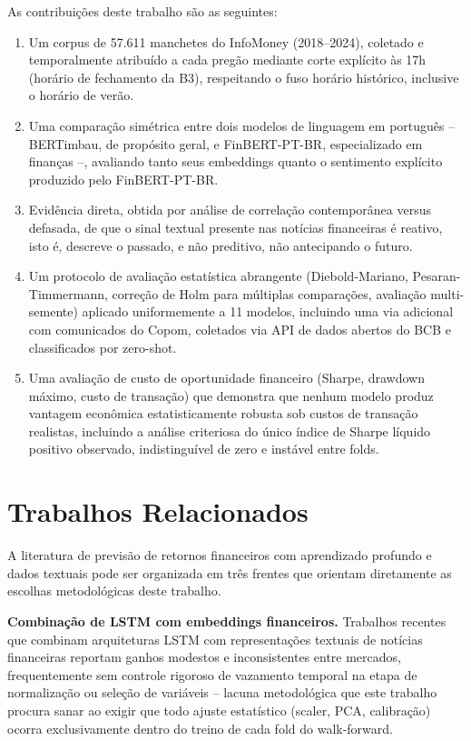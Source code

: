\documentclass[conference]{IEEEtran}
\begin{document}
As contribui\c{c}\~oes deste trabalho s\~ao as seguintes:

\begin{enumerate}
\item Um corpus de 57.611 manchetes do InfoMoney (2018--2024), coletado e temporalmente atribu\'ido a cada preg\~ao mediante corte expl\'icito \`as 17h (hor\'ario de fechamento da B3), respeitando o fuso hor\'ario hist\'orico, inclusive o hor\'ario de ver\~ao.
\item Uma compara\c{c}\~ao sim\'etrica entre dois modelos de linguagem em portugu\^es -- BERTimbau, de prop\'osito geral, e FinBERT-PT-BR, especializado em finan\c{c}as --, avaliando tanto seus embeddings quanto o sentimento expl\'icito produzido pelo FinBERT-PT-BR.
\item Evid\^encia direta, obtida por an\'alise de correla\c{c}\~ao contempor\^anea versus defasada, de que o sinal textual presente nas not\'icias financeiras \'e reativo, isto \'e, descreve o passado, e n\~ao preditivo, n\~ao antecipando o futuro.
\item Um protocolo de avalia\c{c}\~ao estat\'istica abrangente (Diebold-Mariano, Pesaran-Timmermann, corre\c{c}\~ao de Holm para m\'ultiplas compara\c{c}\~oes, avalia\c{c}\~ao multi-semente) aplicado uniformemente a 11 modelos, incluindo uma via adicional com comunicados do Copom, coletados via API de dados abertos do BCB e classificados por zero-shot.
\item Uma avalia\c{c}\~ao de custo de oportunidade financeiro (Sharpe, drawdown m\'aximo, custo de transa\c{c}\~ao) que demonstra que nenhum modelo produz vantagem econ\^omica estatisticamente robusta sob custos de transa\c{c}\~ao realistas, incluindo a an\'alise criteriosa do \'unico \'indice de Sharpe l\'iquido positivo observado, indistingu\'ivel de zero e inst\'avel entre folds.
\end{enumerate}

\section{Trabalhos Relacionados}

A literatura de previs\~ao de retornos financeiros com aprendizado profundo e dados textuais pode ser organizada em tr\^es frentes que orientam diretamente as escolhas metodol\'ogicas deste trabalho.

\textbf{Combina\c{c}\~ao de LSTM com embeddings financeiros.} Trabalhos recentes que combinam arquiteturas LSTM com representa\c{c}\~oes textuais de not\'icias financeiras \cite{gu2024finbertlstm} reportam ganhos modestos e inconsistentes entre mercados, frequentemente sem controle rigoroso de vazamento temporal na etapa de normaliza\c{c}\~ao ou sele\c{c}\~ao de vari\'aveis -- lacuna metodol\'ogica que este trabalho procura sanar ao exigir que todo ajuste estat\'istico (scaler, PCA, calibra\c{c}\~ao) ocorra exclusivamente dentro do treino de cada fold do walk-forward.
\end{document}
